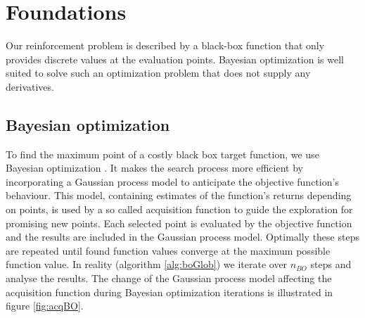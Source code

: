 \chapter{Foundations}
\label{chap:2}

Our reinforcement problem is described by a black-box function that only provides discrete values at the evaluation points. Bayesian optimization is well suited to solve such an optimization problem that does not supply any derivatives.

\section{Bayesian optimization}


To find the maximum point of a costly black box target function, we use Bayesian optimization \cite{brochu2010tutorial,shahriari2016taking,lizotte2008practical}. It makes the search process more efficient by incorporating a Gaussian process model to anticipate the objective function's behaviour. This model, containing estimates of the function's returns depending on points, is used by a so called acquisition function to guide the exploration for promising new points. Each selected point is evaluated by the objective function and the results are included in the Gaussian process model. Optimally these steps are repeated until found function values converge at the maximum possible function value. In reality (algorithm \ref{alg:boGlob}) we iterate over $n_{BO}$ steps and analyse the results. The change of the Gaussian process model affecting the acquisition function during Bayesian optimization iterations is illustrated in figure \ref{fig:acqBO}.\\

